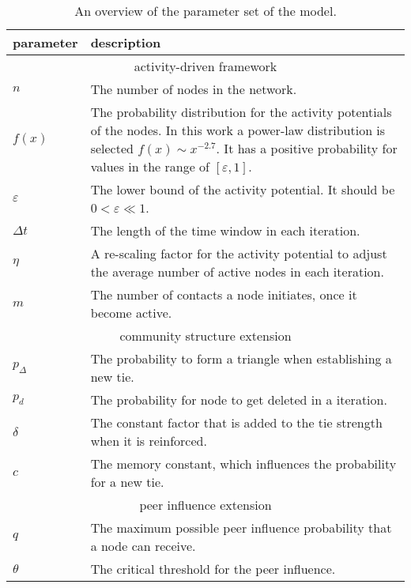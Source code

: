 \begin{table}[]
\centering
\begin{tabular}{lp{10cm}}
\hline
\textbf{parameter} & \textbf{description} \\ \hline \hline
\multicolumn{2}{c}{activity-driven framework} \\ \hline
\( n \) & The number of nodes in the network. \\
\( f(x) \) & The probability distribution for the activity potentials of the nodes. In this work a power-law distribution is selected \( f(x) \sim x^{-2.7} \). It has a positive probability for values in the range of \( [\varepsilon, 1] \). \\
\( \varepsilon \) &  The lower bound of the activity potential. It should be \( 0 < \varepsilon \ll 1 \). \\
\( \Delta t \) &  The length of the time window in each iteration. \\
\( \eta \) &  A re-scaling factor for the activity potential to adjust the average number of active nodes in each iteration. \\
\( m \) & The number of contacts a node initiates, once it become active. \\ \hline \hline

\multicolumn{2}{c}{community structure extension} \\ \hline
\( p_{\Delta} \) & The probability to form a triangle when establishing a new tie. \\
\( p_{d} \) & The probability for node to get deleted in a iteration. \\
\( \delta \) & The constant factor that is added to the tie strength when it is reinforced. \\
\( c \) &  The memory constant, which influences the probability for a new tie.\\ \hline \hline

\multicolumn{2}{c}{peer influence extension} \\ \hline
\( q \) & The maximum possible peer influence probability that a node can receive. \\
\( \theta \) & The critical threshold for the peer influence.  \\ \hline
\end{tabular}

\caption{An overview of the parameter set of the model.}
\label{tbl:all-model-parameter}
\end{table}
